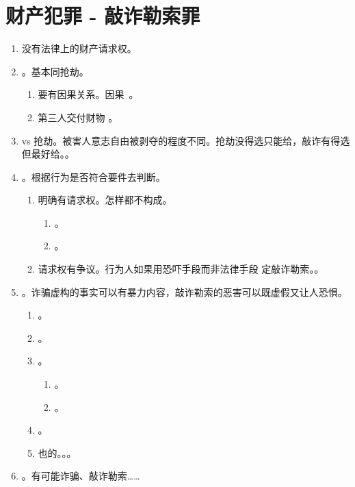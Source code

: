 \section{财产犯罪 - 敲诈勒索罪}
\begin{enumerate}
  \item 没有法律上的财产请求权。
  \item {}。基本同抢劫。
        \begin{enumerate}
          \item \er\san 要有因果关系。\san\si 因果。
          \item 第三人交付财物 \yjt {}。
        \end{enumerate}
  \item vs 抢劫。被害人意志自由被剥夺的程度不同。抢劫没得选只能给，敲诈有得选但最好给。。
  \item {}。根据行为是否符合要件去判断。
        \begin{enumerate}
          \item 明确有请求权。怎样都不构成。
                \begin{enumerate}
                  \item {}。
                  \item {}。
                \end{enumerate}
          \item 请求权有争议。行为人如果用恐吓手段而非法律手段 \yjt 定敲诈勒索。。
        \end{enumerate}
  \item {}。诈骗虚构的事实可以有暴力内容，敲诈勒索的恶害可以既虚假又让人恐惧。
        \begin{enumerate}
          \item {}。
          \item {}。
          \item {}。
                \begin{enumerate}
                  \item {}。
                  \item {}。
                \end{enumerate}
          \item {}。
          \item 也的。。。
        \end{enumerate}
  \item {}。有可能诈骗、敲诈勒索……
\end{enumerate}
